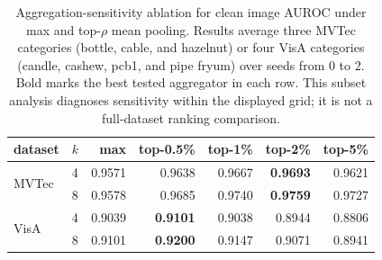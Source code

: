 \begin{table}[!ht]
\centering
\caption{Aggregation-sensitivity ablation for clean image AUROC under max and top-$\rho$ mean pooling. Results average three MVTec categories (bottle, cable, and hazelnut) or four VisA categories (candle, cashew, pcb1, and pipe fryum) over seeds from 0 to 2. Bold marks the best tested aggregator in each row. This subset analysis diagnoses sensitivity within the displayed grid; it is not a full-dataset ranking comparison.}
\label{tab:agg-ablation}
\footnotesize
\setlength{\tabcolsep}{4pt}
\begin{tabular}{llrrrrr}
\toprule
dataset & $k$ & max & top-0.5\% & top-1\% & top-2\% & top-5\% \\
\midrule
\multirow{2}{*}{MVTec} & 4 & 0.9571 & 0.9638 & 0.9667 & \textbf{0.9693} & 0.9621 \\
 & 8 & 0.9578 & 0.9685 & 0.9740 & \textbf{0.9759} & 0.9727 \\
\midrule
\multirow{2}{*}{VisA} & 4 & 0.9039 & \textbf{0.9101} & 0.9038 & 0.8944 & 0.8806 \\
 & 8 & 0.9101 & \textbf{0.9200} & 0.9147 & 0.9071 & 0.8941 \\
\bottomrule
\end{tabular}
\end{table}
